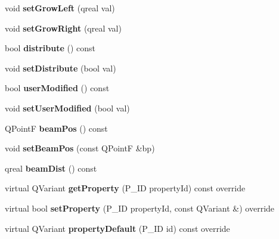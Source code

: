\begin{DoxyCompactItemize}
void {\bfseries set\+Grow\+Left} (qreal val)
\item 
\mbox{\label{class_ms_1_1_beam_a85904836b478aad24eb98a74b78bb8b3}} 
void {\bfseries set\+Grow\+Right} (qreal val)
\item 
\mbox{\label{class_ms_1_1_beam_afdfc2d2e28b7cb931a3dd9c18e365fca}} 
bool {\bfseries distribute} () const
\item 
\mbox{\label{class_ms_1_1_beam_adfa749cc389bbbdd3206905f13c59adf}} 
void {\bfseries set\+Distribute} (bool val)
\item 
\mbox{\label{class_ms_1_1_beam_abe668086b8d95bb15f19a6c5c8d363d1}} 
bool {\bfseries user\+Modified} () const
\item 
\mbox{\label{class_ms_1_1_beam_acaee47bda0dff9e5c242d88b740b9864}} 
void {\bfseries set\+User\+Modified} (bool val)
\item 
\mbox{\label{class_ms_1_1_beam_a7788c97727853b9aca227403832ca1f7}} 
Q\+PointF {\bfseries beam\+Pos} () const
\item 
\mbox{\label{class_ms_1_1_beam_a0a3cac9b70449805312f331bcf9b14d4}} 
void {\bfseries set\+Beam\+Pos} (const Q\+PointF \&bp)
\item 
\mbox{\label{class_ms_1_1_beam_a5782985a37032f4fcfa4594c90fb3341}} 
qreal {\bfseries beam\+Dist} () const
\item 
\mbox{\label{class_ms_1_1_beam_a77ada551f2242d86b6e395d87d7318ce}} 
virtual Q\+Variant {\bfseries get\+Property} (P\+\_\+\+ID property\+Id) const override
\item 
\mbox{\label{class_ms_1_1_beam_aa3247b7a2ac99c7cdf24102ef0da385d}} 
virtual bool {\bfseries set\+Property} (P\+\_\+\+ID property\+Id, const Q\+Variant \&) override
\item 
\mbox{\label{class_ms_1_1_beam_a6ede395428bd8fbc912c099f379a6195}} 
virtual Q\+Variant {\bfseries property\+Default} (P\+\_\+\+ID id) const override

\end{DoxyCompactItemize}
